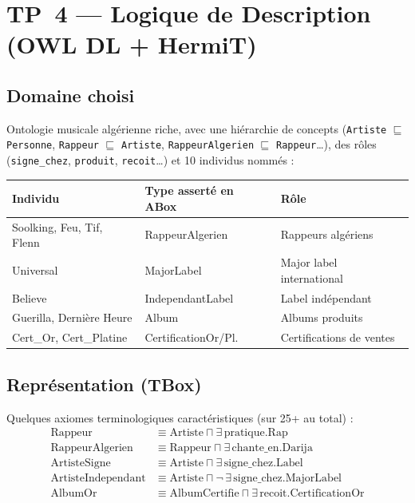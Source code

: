 \documentclass[11pt, a4paper]{article}
\newcommand{\code}[1]{\texttt{#1}}
\newcommand{\sq}{\sqsubseteq}
\begin{document}
\newpage
\section{TP~4 --- Logique de Description (OWL DL + HermiT)}

\subsection*{Domaine choisi}

Ontologie musicale algérienne riche, avec une hiérarchie de concepts
(\code{Artiste} $\sq$ \code{Personne}, \code{Rappeur} $\sq$ \code{Artiste},
\code{RappeurAlgerien} $\sq$ \code{Rappeur}\dots), des rôles
(\code{signe\_chez}, \code{produit}, \code{recoit}\dots) et 10 individus
nommés :

\begin{center}\small
\begin{tabular}{lll}
\toprule
\textbf{Individu} & \textbf{Type asserté en ABox} & \textbf{Rôle} \\
\midrule
Soolking, Feu, Tif, Flenn   & RappeurAlgerien      & Rappeurs algériens \\
Universal                   & MajorLabel           & Major label international \\
Believe                     & IndependantLabel     & Label indépendant \\
Guerilla, Dernière Heure    & Album                & Albums produits \\
Cert\_Or, Cert\_Platine     & CertificationOr/Pl.  & Certifications de ventes \\
\bottomrule
\end{tabular}
\end{center}

\subsection*{Représentation (TBox)}

Quelques axiomes terminologiques caractéristiques (sur 25+ au total) :
\begin{align*}
\text{Rappeur}            &\equiv \text{Artiste} \sqcap \exists\,\text{pratique}.\text{Rap} \\
\text{RappeurAlgerien}    &\equiv \text{Rappeur} \sqcap \exists\,\text{chante\_en}.\text{Darija} \\
\text{ArtisteSigne}       &\equiv \text{Artiste} \sqcap \exists\,\text{signe\_chez}.\text{Label} \\
\text{ArtisteIndependant} &\equiv \text{Artiste} \sqcap \lnot\,\exists\,\text{signe\_chez}.\text{MajorLabel} \\
\text{AlbumOr}            &\equiv \text{AlbumCertifie} \sqcap \exists\,\text{recoit}.\text{CertificationOr}
\end{align*}
\end{document}
